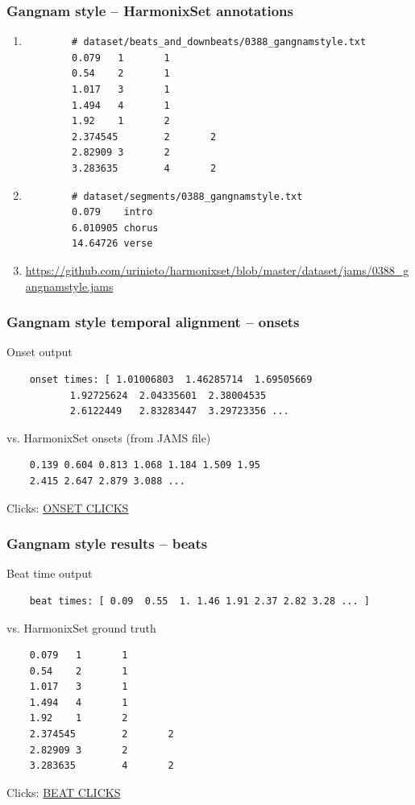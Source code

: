 \documentclass{beamer}
\begin{document}
\begin{frame}[fragile]
	\frametitle{Gangnam style -- HarmonixSet annotations}
	\begin{enumerate}
		\item
		\begin{verbatim}
		# dataset/beats_and_downbeats/0388_gangnamstyle.txt
		0.079   1       1
		0.54    2       1
		1.017   3       1
		1.494   4       1
		1.92    1       2
		2.374545        2       2
		2.82909 3       2
		3.283635        4       2
		\end{verbatim}
		\item
		\begin{verbatim}
		# dataset/segments/0388_gangnamstyle.txt
		0.079    intro
		6.010905 chorus
		14.64726 verse
		\end{verbatim}
		\item
		\href{https://github.com/urinieto/harmonixset/blob/master/dataset/jams/0388_gangnamstyle.jams}{https://github.com/urinieto/harmonixset/blob/master/dataset/jams/0388\_gangnamstyle.jams}
	\end{enumerate}

\end{frame}

\begin{frame}[fragile]
	\frametitle{Gangnam style temporal alignment -- onsets}
	Onset output
	\begin{verbatim}
	onset times: [ 1.01006803  1.46285714  1.69505669 
	       1.92725624  2.04335601  2.38004535
	       2.6122449   2.83283447  3.29723356 ...
	\end{verbatim}
	vs. HarmonixSet onsets (from JAMS file)
	\begin{verbatim}
	0.139 0.604 0.813 1.068 1.184 1.509 1.95
	2.415 2.647 2.879 3.088 ...
	\end{verbatim}
	Clicks: \href{run:./gangnam_onsets.wav}{ONSET CLICKS}
\end{frame}


\begin{frame}[fragile]
	\frametitle{Gangnam style results -- beats}
	Beat time output
	\begin{verbatim}
	beat times: [ 0.09  0.55  1. 1.46 1.91 2.37 2.82 3.28 ... ]
	\end{verbatim}
	vs. HarmonixSet ground truth
	\begin{verbatim}
	0.079   1       1
	0.54    2       1
	1.017   3       1
	1.494   4       1
	1.92    1       2
	2.374545        2       2
	2.82909 3       2
	3.283635        4       2
	\end{verbatim}
	Clicks: \href{run:./gangnam_beats.wav}{BEAT CLICKS}
\end{frame}
\end{document}
